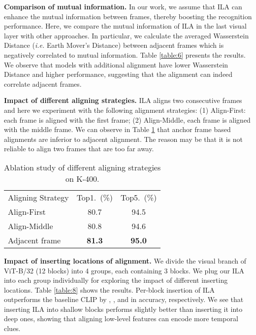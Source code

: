 \documentclass[10pt,twocolumn,letterpaper]{article}
\begin{document}
\vspace{0.05in}
\noindent\textbf{Comparison of mutual information.} In our work, we assume that ILA can enhance the mutual information between frames, thereby boosting the recognition performance. 
Here, we compare the mutual information of ILA in the last visual layer with other approaches.
In particular, we calculate the averaged Wasserstein Distance (\emph{i.e.} Earth Mover's Distance) \cite{arjovsky2017wgan} between adjacent frames which is negatively correlated to mutual information. 
Table \ref{table:6} presents the results.
We observe that models with additional alignment have lower Wasserstein Distance and higher performance, suggesting that the alignment can indeed correlate adjacent frames.



\vspace{0.05in}
\noindent\textbf{Impact of different aligning strategies.} ILA aligns two consecutive frames and here we experiment with the following alignment strategies: (1) Align-First: each frame is aligned with the first frame; (2) Align-Middle, each frame is aligned with the middle frame. 
We can observe in Table \ref{table:7} that anchor frame based alignments are inferior to adjacent alignment.
The reason may be that it is not reliable to align two frames that are too far away.


\begin{table}[htbp]\small
\caption{Ablation study of different aligning strategies on K-400. 
}
\vspace{-0.1in}
\begin{center}
\renewcommand\arraystretch{1.2}
\begin{tabular}{lcc}
\toprule
Aligning Strategy                       & Top1.~(\%)     & Top5.~(\%)     \\ 
\cmidrule(lr){1-1} \cmidrule(lr){2-2} \cmidrule(lr){3-3}
Align-First                   & 80.7          & 94.5          \\
Align-Middle                  & 80.8          & 94.6          \\
Adjacent frame & \textbf{81.3} & \textbf{95.0} \\ \bottomrule
\end{tabular}
\end{center}
\label{table:7}
\vspace{-0.2in}
\end{table}



\vspace{0.05in}
\noindent\textbf{Impact of inserting locations of alignment.} We divide the visual branch of ViT-B/32 (12 blocks) into 4 groups, each containing 3 blocks.
We plug our ILA into each group individually for exploring the impact of different inserting locations. Table \ref{table:8} shows the results. 
Per-block insertion of ILA outperforms the baseline CLIP by , ,  and  in accuracy, respectively. 
We see that inserting ILA into shallow blocks performs slightly better than inserting it into deep ones, showing that aligning low-level features can encode more temporal clues.
\end{document}
